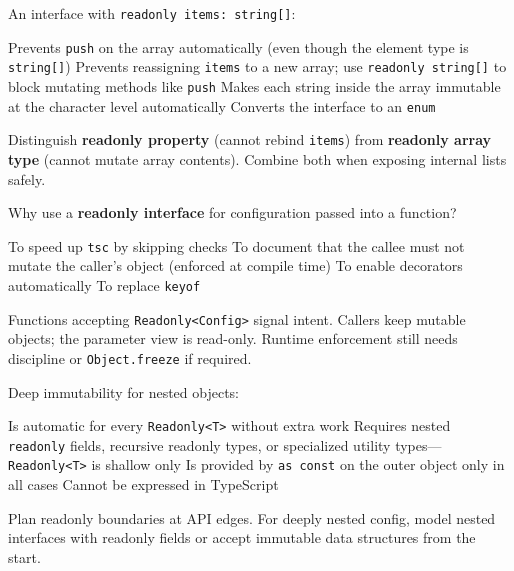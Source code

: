 \question[4]
An interface with \lstinline[style=tsinline]|readonly items: string[]|:
\begin{choices}
  \choice Prevents \lstinline[style=tsinline]|push| on the array automatically (even though the element type is \lstinline[style=tsinline]|string[]|)
  \CorrectChoice Prevents reassigning \lstinline[style=tsinline]|items| to a new array; use \lstinline[style=tsinline]|readonly string[]| to block mutating methods like \lstinline[style=tsinline]|push|
  \choice Makes each string inside the array immutable at the character level automatically
  \choice Converts the interface to an \lstinline[style=tsinline]|enum|
\end{choices}
\begin{solution}
  Distinguish \textbf{readonly property} (cannot rebind \lstinline[style=tsinline]|items|) from \textbf{readonly array type} (cannot mutate array contents). Combine both when exposing internal lists safely.
\end{solution}

\question[4]
Why use a \textbf{readonly interface} for configuration passed into a function?
\begin{choices}
  \choice To speed up \texttt{tsc} by skipping checks
  \CorrectChoice To document that the callee must not mutate the caller's object (enforced at compile time)
  \choice To enable decorators automatically
  \choice To replace \lstinline[style=tsinline]|keyof|
\end{choices}
\begin{solution}
  Functions accepting \lstinline[style=tsinline]|Readonly<Config>| signal intent. Callers keep mutable objects; the parameter view is read-only. Runtime enforcement still needs discipline or \lstinline[style=tsinline]|Object.freeze| if required.
\end{solution}

\question[4]
Deep immutability for nested objects:
\begin{choices}
  \choice Is automatic for every \lstinline[style=tsinline]|Readonly<T>| without extra work
  \CorrectChoice Requires nested \lstinline[style=tsinline]|readonly| fields, recursive readonly types, or specialized utility types---\lstinline[style=tsinline]|Readonly<T>| is shallow only
  \choice Is provided by \lstinline[style=tsinline]|as const| on the outer object only in all cases
  \choice Cannot be expressed in TypeScript
\end{choices}
\begin{solution}
  Plan readonly boundaries at API edges. For deeply nested config, model nested interfaces with readonly fields or accept immutable data structures from the start.
\end{solution}

